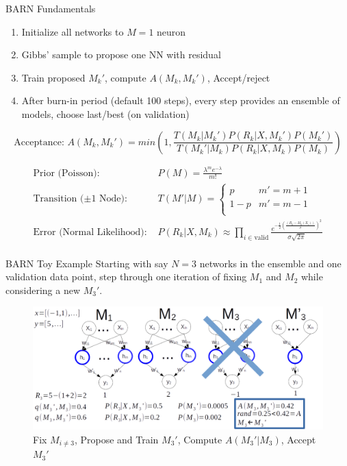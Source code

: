 \documentclass{beamer}
\begin{document}
\begin{frame}
\begin{columns}
\begin{column}{.33\textwidth}
\begin{minipage}{.98\textwidth}
{\begin{myblock}{BARN Fundamentals}
\begin{enumerate}
\item Initialize all networks to $M=1$ neuron
\item Gibbs' sample to propose one NN with residual
\item Train proposed $M_k'$, compute $A(M_k,M_k')$, Accept/reject
\item After burn-in period (default 100 steps), every step provides an ensemble of models, choose last/best (on validation)
\end{enumerate}

$$
\text{Acceptance: } A(M_k,M_k') = min(1, \frac{T(M_k|M_k') P(R_k|X,M_k')P(M_k')}{T(M_k'|M_k) P(R_k|X,M_k)P(M_k)})
$$

$$
\begin{aligned}
\text{Prior (Poisson): } & P(M) = \frac{\lambda^m e^{-\lambda}}{m!} \\
\text{Transition ($\pm1$ Node): } & T(M'|M) = \begin{cases}
			p & m' = m + 1 \\
			1-p & m' = m - 1 \\
\end{cases} \\
\text{Error (Normal Likelihood): } & P(R_k|X,M_k) \approx \prod_{i \in \text{valid}} \frac{e^{-\frac{1}{2}\left(\frac{(R_k-M_k(X_i))}{\sigma}\right)^2}}{\sigma \sqrt{2\pi}} \\
\end{aligned}
$$
			\end{myblock}
			\begin{myblock}{BARN Toy Example}
Starting with say $N=3$ networks in the ensemble and one validation data point, step through one iteration of fixing $M_1$ and $M_2$ while considering a new $M_3'$.

\begin{figure}[h]
\includegraphics[scale=0.75]{barn_ex3.png}
    \caption{Fix $M_{i\neq 3}$, Propose and Train $M_3'$, Compute $A(M_3'|M_3)$, Accept $M_3'$}
\end{figure}
			\end{myblock}

}
\end{minipage}
\end{column}
\end{columns}
\end{frame}
\end{document}
